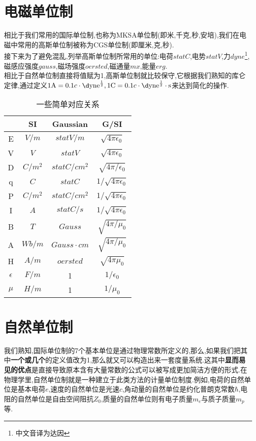 \documentclass[lang=cn,newtx,10pt,scheme=chinese,thmcnt=section]{elegantbook}
\begin{document}
\section{电磁单位制}
相比于我们常用的国际单位制,也称为MKSA单位制(即米,千克,秒,安培),我们在电磁中常用的高斯单位制被称为CGS单位制(即厘米,克,秒).\\接下来为了避免混乱,列举高斯单位制所常用的单位:电荷$statC$,电势$statV$,力$dyne$\footnote{中文音译为达因},磁感应强度$gauss$,磁场强度$oersted$,磁通量$mx$,能量$erg$.\\

相比于自然单位制直接将值赋为1,高斯单位制就比较保守,它根据我们熟知的库仑定律,通过定义$1\mathrm{A}=0.1c\cdot\mathrm{\d yne}^{\frac12},1\mathrm{C}=0.1c\cdot\rm{\d yne}^{\frac12}\cdot s$来达到简化的操作.\\
\begin{table}[htbp]
	\centering
	\caption{一些简单对应关系}
	\begin{tabular}{|c|c|c|c|}
		\hline
		& SI      & Gaussian        & G/SI                     \\ \hline
		E          & $V/m$   & $statV/m$       & $\sqrt{4\pi\epsilon_0}$  \\ \hline
		V          & $V$     & $statV$         & $\sqrt{4\pi\epsilon_0}$  \\ \hline
		D          & $C/m^2$ & $statC/cm^2$    & $\sqrt{4\pi/\epsilon_0}$ \\ \hline
		q          & $C$     & $statC$         & $1/\sqrt{4\pi\epsilon_0}$ \\ \hline
		P          & $C/m^2$ & $statC/cm^2$    & $1/\sqrt{4\pi\epsilon_0}$ \\ \hline
		I          & $A$     & $statC/s$       & $1/\sqrt{4\pi\epsilon_0}$ \\ \hline
		B          & $T$     & $Gauss$         & $\sqrt{4\pi/\mu_0}$      \\ \hline
		A          & $Wb/m$  & $Gauss\cdot cm$ & $\sqrt{4\pi/\mu_0}$      \\ \hline
		H          & $A/m$   & $oersted$       & $\sqrt{4\pi\mu_0}$       \\ \hline
		$\epsilon$ & $F/m$   & 1               & $1/\epsilon_0$           \\ \hline
		$\mu$      & $H/m$   & 1               & $1/\mu_0$                \\ \hline
	\end{tabular}
\end{table}
\section{自然单位制}
我们熟知,国际单位制的7个基本单位是通过物理常数所定义的,那么,如果我们把其中\textbf{一个或几个}的定义值改为1,那么就又可以构造出来一套度量系统.这其中\textbf{显而易见的优点}是直接导致原本含有大量常数的公式可以被写成更加简洁方便的形式.在物理学里,自然单位制就是一种建立于此类方法的计量单位制度.例如,电荷的自然单位是基本电荷${\displaystyle e}$,速度的自然单位是光速${\displaystyle c}$,角动量的自然单位是约化普朗克常数${\displaystyle \hbar }$,电阻的自然单位是自由空间阻抗${\displaystyle Z_{0}}$,质量的自然单位则有电子质量${\displaystyle m_{e}}$与质子质量${\displaystyle m_{p}}$等.\\
\end{document}

